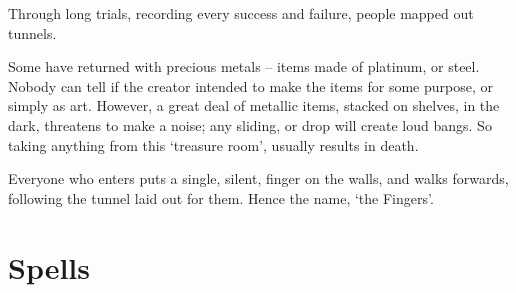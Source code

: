 \begin{multicols}{2}
Through long trials, recording every success and failure, people mapped out tunnels.

Some have returned with precious metals -- items made of platinum, or steel.
Nobody can tell if the creator intended to make the items for some purpose, or simply as art.
However, a great deal of metallic items, stacked on shelves, in the dark, threatens to make a noise; any sliding, or drop will create loud bangs.
So taking anything from this `treasure room', usually results in death.

Everyone who enters puts a single, silent, finger on the walls, and walks forwards, following the tunnel laid out for them.
Hence the name, `the Fingers'.

\end{multicols}


\printindex[history]

\printindex[talismans]

\section{Spells}

\begin{multicols}{2}

\revelationSpell

\doomStudySpell

\deathStormSpell

\findGatewaySpell

\end{multicols}

\printindex

